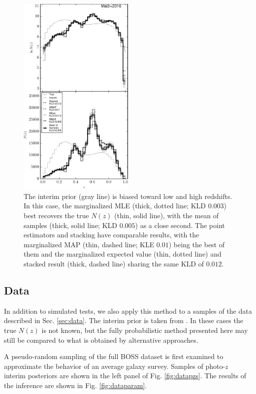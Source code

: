 \documentclass[preprint]{aastex}
\begin{document}
\begin{figure}
\includegraphics[width=0.5\textwidth]{figs/bint/comps.pdf}
\caption{The interim prior (gray line) is biased toward low and high redshifts. 
 In this case, the marginalized MLE (thick, dotted line; KLD $0.003$) best 
recovers the true $N(z)$ (thin, solid line), with the mean of samples (thick, 
solid line; KLD $0.005$) as a close second.  The point estimators and stacking 
have comparable results, with the marginalized MAP (thin, dashed line; KLE 
$0.01$) being the best of them and the marginalized expected value (thin, 
dotted line) and stacked result (thick, dashed line) sharing the same KLD of 
$0.012$.}
\label{fig:intb-comp}
\end{figure}

\subsection{Data}
\label{sec:boss}

In addition to simulated tests, we also apply this method to a samples of the 
data described in Sec. \ref{sec:data}.  The interim prior is taken from 
\citet{Sheldon2012}.  In these cases the true $N(z)$ is not known, but the 
fully probabilistic method presented here may still be compared to what is 
obtained by alternative approaches.

A pseudo-random sampling of the full BOSS dataset is first examined to 
approximate the behavior of an average galaxy survey.  Samples of photo-$z$ 
interim posteriors are shown in the left panel of Fig. \ref{fig:datapzs}.  The 
results of the inference are shown in Fig. \ref{fig:dataparam}.
\end{document}
